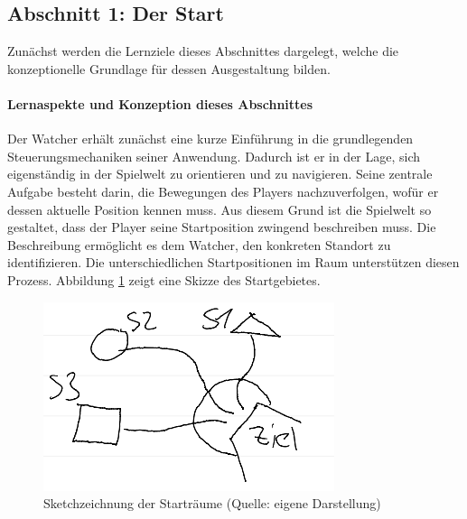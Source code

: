 \subsection{Abschnitt 1: Der Start}
Zunächst werden die Lernziele dieses Abschnittes dargelegt, welche die konzeptionelle Grundlage für dessen Ausgestaltung bilden.


\paragraph{Lernaspekte und Konzeption dieses Abschnittes}

Der Watcher erhält zunächst eine kurze Einführung in die grundlegenden Steuerungsmechaniken seiner Anwendung. Dadurch ist er in der Lage, sich eigenständig in der Spielwelt zu orientieren und zu navigieren. Seine zentrale Aufgabe besteht darin, die Bewegungen des Players nachzuverfolgen, wofür er dessen aktuelle Position kennen muss. Aus diesem Grund ist die Spielwelt so gestaltet, dass der Player seine Startposition zwingend beschreiben muss. Die Beschreibung ermöglicht es dem Watcher, den konkreten Standort zu identifizieren. Die unterschiedlichen Startpositionen im Raum unterstützen diesen Prozess. Abbildung \ref{fig:sketch-starterrooms} zeigt eine Skizze des Startgebietes.

\begin{figure}[ht]
\centering
\includegraphics[width=1\linewidth]{content/pictures/Startplaces_Sketch.png}
\caption{Sketchzeichnung der Starträume (Quelle: eigene Darstellung)}
\label{fig:sketch-starterrooms}
\end{figure}


